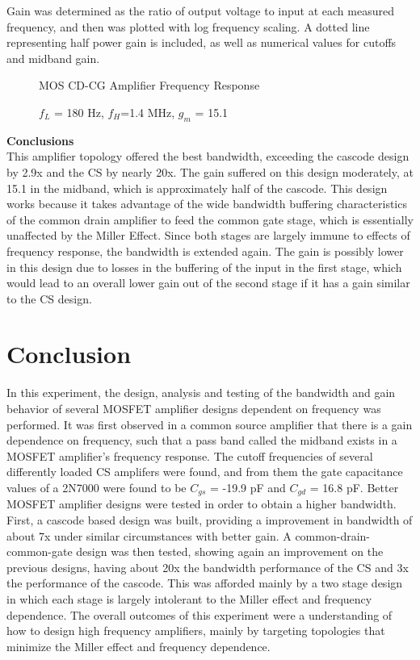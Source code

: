 \documentclass[12pt]{article}
\begin{document}
Gain was determined as the ratio of output voltage to input at each measured frequency, and then was plotted with log frequency scaling. A dotted line representing half power gain is included, as well as numerical values for cutoffs and midband gain.
\FloatBarrier
\begin{figure}[h!]
\begin{center}
    	\resizebox{0.6\textwidth}{!}{}
\end{center}
\caption{MOS CD-CG Amplifier Frequency Response}
\caption*{$f_L$ = 180 Hz, $f_H$=1.4 MHz, $g_m$ = 15.1}
\end{figure}
\FloatBarrier
\textbf{Conclusions}\\
This amplifier topology offered the best bandwidth, exceeding the cascode design by 2.9x and the CS by nearly 20x. The gain suffered on this design moderately, at 15.1 in the midband, which is approximately half of the cascode. This design works because it takes advantage of the wide bandwidth buffering characteristics of the common drain amplifier to feed the common gate stage, which is essentially unaffected by the Miller Effect. Since both stages are largely immune to effects of frequency response, the bandwidth is extended again. The gain is possibly lower in this design due to losses in the buffering of the input in the first stage, which would lead to an overall lower gain out of the second stage if it has a gain similar to the CS design.

\vspace{-12pt}\section{Conclusion}
In this experiment, the design, analysis and testing of the bandwidth and gain behavior of several MOSFET amplifier designs dependent on frequency was performed. It was first observed in a common source amplifier that there is a gain dependence on frequency, such that a pass band called the midband exists in a MOSFET amplifier's frequency response. The cutoff frequencies of several differently loaded CS amplifers were found, and from them the gate capacitance values of a 2N7000 were found to be $C_{gs}$ = -19.9 pF and $C_{gd}$ = 16.8 pF. Better MOSFET amplifier designs were tested in order to obtain a higher bandwidth. First, a cascode based design was built, providing a improvement in bandwidth of about 7x under similar circumstances with better gain. A common-drain-common-gate design was then tested, showing again an improvement on the previous designs, having about 20x the bandwidth performance of the CS and 3x the performance of the cascode. This was afforded mainly by a two stage design in which each stage is largely intolerant to the Miller effect and frequency dependence. The overall outcomes of this experiment were a understanding of how to design high frequency amplifiers, mainly by targeting topologies that minimize the Miller effect and frequency dependence.
\end{document}
